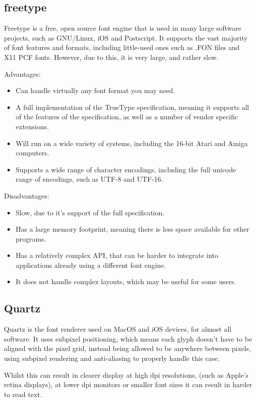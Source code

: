 \documentclass{report}
\begin{document}
\subsection{freetype}
Freetype is a free, open source font engine that is used in many large software
projects, such as GNU/Linux, iOS and Postscript. It supports the vast majority
of font features and formats, including little-used ones such as .FON files and
X11 PCF fonts. However, due to this, it is very large, and rather slow.

Advantages:
\begin{itemize}
\item{Can handle virtually any font format you may need.}
\item{A full implementation of the TrueType specification, meaning it supports
    all of the features of the specification, as well as a number of vendor
    specific extensions.}
\item{Will run on a wide variety of systems, including the 16-bit Atari and
    Amiga computers.}
\item{Supports a wide range of character encodings, including the full unicode
    range of encodings, such as UTF-8 and UTF-16.}
\end{itemize}

Disadvantages:
\begin{itemize}
\item{Slow, due to it's support of the full specification.}
\item{Has a large memory footprint, meaning there is less space available for
    other programs.}
\item{Has a relatively complex API, that can be harder to integrate into
    applications already using a different font engine.}
\item{It does not handle complex layouts, which may be useful for some users.}
\end{itemize}

\subsection{Quartz}
Quartz is the font renderer used on MacOS and iOS devices, for almost all
software. It uses subpixel positioning, which means each glyph doesn't have to
be aligned with the pixel grid, instead being allowed to be anywhere between
pixels, using subpixel rendering and anti-aliasing to properly handle this
case.

Whilst this can result in clearer display at high dpi resolutions, (such as
Apple's retina displays), at lower dpi monitors or smaller font sizes it can
result in harder to read text.
\end{document}
